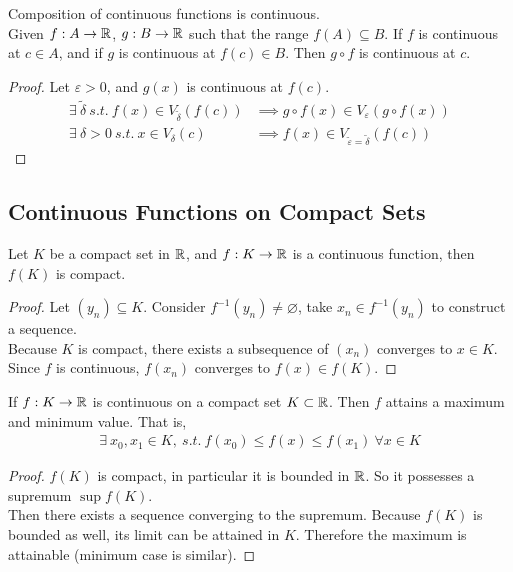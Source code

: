 \documentclass[11pt]{article}
\begin{document}
	\begin{theorem}
		Composition of continuous functions is continuous. \\
		Given $f: A \to \mathbb{R}$, $g: B \to \mathbb{R}$ such that the range $f(A) \subseteq B$. If $f$ is continuous at $c \in A$, and if $g$ is continuous at $f(c) \in B$. Then $g \circ f$ is continuous at $c$.
	\end{theorem}
	
	\begin{proof}
		Let $\varepsilon > 0$, and $g(x)$ is continuous at $f(c)$. 
		\begin{align}
			\exists\ \tilde{\delta}\ s.t.\ f(x) \in V_{\tilde{\delta}}(f(c)) &\implies g \circ f(x) \in V_\varepsilon (g \circ f(x)) \\
			\exists\ \delta > 0\ s.t.\ x \in V_\delta(c) &\implies f(x) \in V_{\tilde{\varepsilon} = \tilde{\delta}} (f(c))
		\end{align}
	\end{proof}
	
	\subsection{Continuous Functions on Compact Sets}
	
	\begin{theorem}
		Let $K$ be a compact set in $\mathbb{R}$, and $f: K \to \mathbb{R}$ is a continuous function, then $f(K)$ is compact.
	\end{theorem}
	
	\begin{proof}
		Let $(y_n) \subseteq K$. Consider $f^{-1}(y_n) \neq \varnothing$, take $x_n \in f^{-1}(y_n)$ to construct a sequence.\\
		Because $K$ is compact, there exists a subsequence of $(x_n)$ converges to $x \in K$.\\
		Since $f$ is continuous, $f(x_n)$ converges to $f(x) \in f(K)$.
	\end{proof}
	
	\begin{theorem}
		If $f: K \to \mathbb{R}$ is continuous on a compact set $K \subset \mathbb{R}$. Then $f$ attains a maximum and minimum value. That is,
		\begin{align}
			\exists\ x_0, x_1 \in K,\ s.t.\ f(x_0) \leq f(x) \leq f(x_1)\ \forall x \in K
		\end{align}
	\end{theorem}
	
	\begin{proof}
		$f(K)$ is compact, in particular it is bounded in $\mathbb{R}$. So it possesses a supremum $\sup f(K)$. \\
		Then there exists a sequence converging to the supremum. 
		Because $f(K)$ is bounded as well, its limit can be attained in $K$. Therefore the maximum is attainable (minimum case is similar).
	\end{proof}
	
\end{document}

